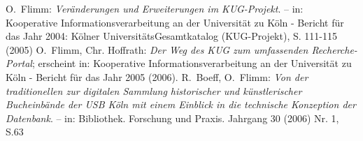 \documentclass[11pt, twoside, a4paper, BCOR8mm, DIV12, bibtotoc,idxtotoc]{scrbook}
\begin{document}
\begin{thebibliography}{ChBr82}
\originalTeX

 O.~Flimm: \emph{Veränderungen und
    Erweiterungen im KUG-Projekt}. -- in: Kooperative
  Informationsverarbeitung an der Universität zu Köln - Bericht für
  das Jahr 2004: Kölner UniversitätsGesamtkatalog (KUG-Projekt), S.
  111-115 (2005)
 O.~Flimm, Chr. Hoffrath: \emph{Der
    Weg des KUG zum umfassenden Recherche-Portal}; erscheint in:
  Kooperative Informationsverarbeitung an der Universität zu Köln -
  Bericht für das Jahr 2005 (2006).
 R.~Boeff, O.~Flimm: \emph{Von
    der traditionellen zur digitalen Sammlung historischer und
    künstlerischer Bucheinbände der USB Köln mit einem Einblick in die
    technische Konzeption der Datenbank}. -- in: Bibliothek. Forschung
  und Praxis. Jahrgang 30 (2006) Nr. 1, S.63
\end{thebibliography}
\germanTeX
\end{document}
